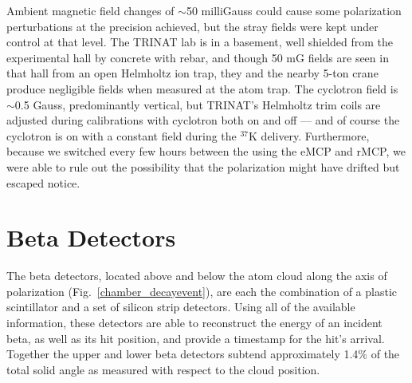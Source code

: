 
Ambient magnetic field changes of $\sim$50 milliGauss could cause some polarization perturbations at the precision achieved, but the stray fields were kept under control at that level.  The TRINAT lab is in a basement, well shielded from the experimental hall by concrete with rebar, and though 50 mG fields are seen in that hall from an open Helmholtz ion trap, they and the nearby 5-ton crane produce negligible fields when measured at the atom trap. The cyclotron field is $\sim$0.5 Gauss, predominantly vertical, 
but TRINAT's Helmholtz trim coils are adjusted during calibrations with cyclotron both on and off --- and of course the cyclotron is on with a constant field during the $^{37}$K delivery.  Furthermore, because we switched every few hours between the using the eMCP and rMCP, we were able to rule out the possibility that the polarization might have drifted but escaped notice.  


\section{Beta Detectors}
\label{section:betadetectors}
The beta detectors, located above and below the atom cloud along the axis of polarization (Fig.~\ref{chamber_decayevent}), are each the combination of a plastic scintillator and a set of silicon strip detectors.  Using all of the available information, these detectors are able to reconstruct the energy of an incident beta, as well as its hit position, and provide a timestamp for the hit's arrival.  Together the upper and lower beta detectors subtend approximately 1.4\% of the total solid angle as measured with respect to the cloud position. 

